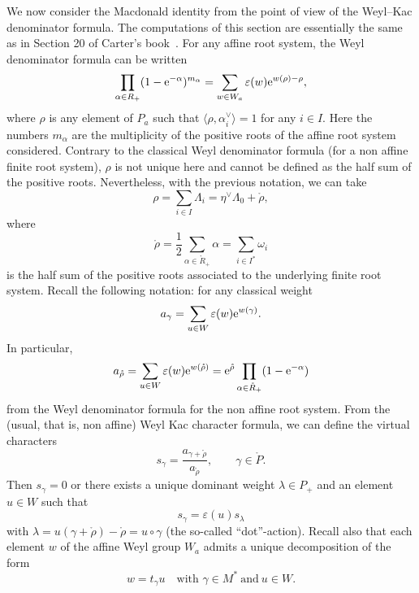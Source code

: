 \documentclass[pdftex]{sigma}
\numberwithin{equation}{section}
\newcommand{\al}{\alpha}
\begin{document}
We now consider the Macdonald identity from the point of view of the Weyl--Kac
denominator formula. The computations of this section are essentially the same
as in Section 20 of Carter's book~\cite{carter_affine}. For any affine root
system, the Weyl denominator formula can be written
\begin{equation}
\prod_{\alpha\in R_{+}}(1-{\rm e}^{-\alpha})^{m_{\alpha}}=\sum_{w\in W_{a}%
}\varepsilon(w){\rm e}^{w(\rho)-\rho},\label{WKDF}%
\end{equation}
where $\rho$ is any element of $P_{a}$ such that $\bigl\langle\rho,\al_i^\vee\bigr\rangle=1$
for any $i\in I$. Here the numbers $m_{\alpha}$ are the multiplicity of the
positive roots of the affine root system considered. Contrary to the classical
Weyl denominator formula (for a non affine finite root system), $\rho$ is not
unique here and cannot be defined as the half sum of the positive roots.
Nevertheless, with the previous notation, we can take%
\[
\rho=\sum_{i\in I}\Lambda_{i}=\eta^{\vee}\Lambda_{0}+\mathring{\rho},%
\]
where
\[
\mathring{\rho}=\frac{1}{2}\sum_{\alpha\in\mathring{R}_{+}}\alpha=\sum_{i \in
	I^{*}}\omega_{i}%
\]
is the half sum of the positive roots associated to the underlying finite root
system. Recall the following notation: for any classical weight %
\[
a_{\gamma}=\sum_{u\in W}\varepsilon(w){\rm e}^{w(\gamma)}.
\]
In particular,
\[
a_{\mathring{\rho}}=\sum_{u\in W}\varepsilon(w){\rm e}^{w(\mathring{\rho})}={\rm e}^{
	\mathring{\rho}}\prod_{\alpha\in\mathring{R}_{+}}(1-{\rm e}^{-\alpha})
\]
from the Weyl denominator formula for the non affine root system. From the
(usual, that is, non affine) Weyl Kac character formula, we can define the
virtual characters%
\[
s_{\gamma}=\frac{a_{\gamma+\mathring{\rho}}}{a_{\mathring{\rho}}},\qquad\gamma
\in\mathring{P}.
\]
Then $s_{\gamma}=0$ or there exists a unique dominant weight $\lambda\in
P_{+}$ and an element $u\in W$ such that
\begin{equation}
s_{\gamma}=\varepsilon(u)s_{\lambda}\label{SR}%
\end{equation}
with $\lambda=u(\gamma+\mathring{\rho})-\mathring{\rho}=u\circ\gamma$ (the
so-called ``dot''-action). Recall also that each element $w$ of the affine Weyl
group $W_{a}$ admits a unique decomposition of the form%
\[
w=t_{\gamma}u \quad \text{with }\gamma\in M^{\ast} \ \text{and}\ u\in W.
\]
\end{document}
